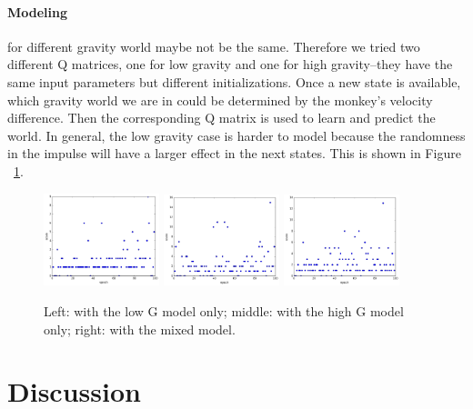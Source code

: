 \documentclass[11pt]{article}
\begin{document}
\paragraph{Modeling} for different gravity world maybe not be the same. Therefore we tried two different Q matrices, one for low gravity and one for high gravity--they have the same input parameters but different initializations. Once a new state is available, which gravity world we are in could be determined by the monkey's velocity difference. Then the corresponding Q matrix is used to learn and predict the world. In general, the low gravity case is harder to model because the randomness in the impulse will have a larger effect in the next states. This is shown in Figure ~\ref{QModel}.
\begin{figure}[] 
\centering
        \includegraphics[width=0.3\textwidth]{Plot/learn_lowonly2.png}
        \includegraphics[width=0.3\textwidth]{Plot/learn_highonly2.png}
        \includegraphics[width=0.3\textwidth]{Plot/learn_mix.png}
        \caption{Left: with the low G model only; middle: with the high G model only; right: with the mixed model.}
            \label{QModel}
\end{figure}

\section{Discussion} 
\paragraph{}
\end{document}

